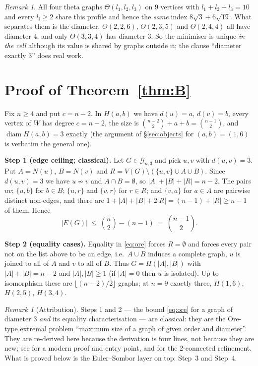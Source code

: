 \documentclass[11pt]{amsart}
\theoremstyle{remark}
\newtheorem{remark}[theorem]{Remark}
\DeclareMathOperator{\diam}{diam}
\newcommand{\Gnd}{\mathcal G}
\begin{document}
\begin{remark}\label{rem:ties}
All four theta graphs $\Theta(l_1,l_2,l_3)$ on $9$ vertices with
$l_1+l_2+l_3=10$ and every $l_i\ge2$ share this profile and hence the
\emph{same} index $8\sqrt3+6\sqrt{19}$. What separates them is the diameter:
$\Theta(2,2,6)$, $\Theta(2,3,5)$ and $\Theta(2,4,4)$ all have diameter $4$,
and only $\Theta(3,3,4)$ has diameter $3$. So the minimiser is unique
\emph{in the cell} although its value is shared by graphs outside it; the
clause ``diameter exactly $3$'' does real work.
\end{remark}

\section{Proof of Theorem~\ref{thm:B}}\label{sec:max}

Fix $n\ge4$ and put $c=n-2$. In $H(a,b)$ we have $d(u)=a$, $d(v)=b$, every
vertex of $W$ has degree $c=n-2$, the size is
$\binom{n-2}2+a+b=\binom{n-1}2$, and $\diam H(a,b)=3$ exactly (the argument of
\S\ref{sec:objects} for $(a,b)=(1,6)$ is verbatim the general one).

\medskip
\noindent\textbf{Step 1 (edge ceiling; classical).}
Let $G\in\Gnd_{n,3}$ and pick $u,v$ with $d(u,v)=3$. Put $A=N(u)$, $B=N(v)$
and $R=V(G)\setminus(\{u,v\}\cup A\cup B)$. Since $d(u,v)=3$ we have
$u\not\sim v$ and $A\cap B=\emptyset$, so $|A|+|B|+|R|=n-2$. The pairs
$uv$; $\{u,b\}$ for $b\in B$; $\{u,r\}$ and $\{v,r\}$ for $r\in R$; and
$\{v,a\}$ for $a\in A$ are pairwise distinct non-edges, and there are
$1+|A|+|B|+2|R|=(n-1)+|R|\ge n-1$ of them. Hence
\begin{equation}\label{eq:ore}
 |E(G)|\ \le\ \binom n2-(n-1)\ =\ \binom{n-1}2 .
\end{equation}

\medskip
\noindent\textbf{Step 2 (equality cases).}
Equality in \eqref{eq:ore} forces $R=\emptyset$ and forces every pair not on
the list above to be an edge, i.e.\ $A\cup B$ induces a complete graph, $u$ is
joined to all of $A$ and $v$ to all of $B$. Thus $G=H(|A|,|B|)$ with
$|A|+|B|=n-2$ and $|A|,|B|\ge1$ (if $|A|=0$ then $u$ is isolated). Up to
isomorphism these are $\lfloor(n-2)/2\rfloor$ graphs; at $n=9$ exactly three,
$H(1,6)$, $H(2,5)$, $H(3,4)$.

\begin{remark}[Attribution]\label{rem:ore}
Steps 1 and 2 --- the bound \eqref{eq:ore} for a graph of diameter $3$
\emph{and} its equality characterisation --- are classical: they are the
Ore-type extremal problem ``maximum size of a graph of given order and
diameter''. They are re-derived here because the derivation is four lines, not
because they are new; see \cite{Ore2023} for a modern proof and entry point,
and \cite{Tokyo2010} for the $2$-connected refinement. What is proved below is
the Euler--Sombor layer on top: Step~3 and Step~4.
\end{remark}
\end{document}
